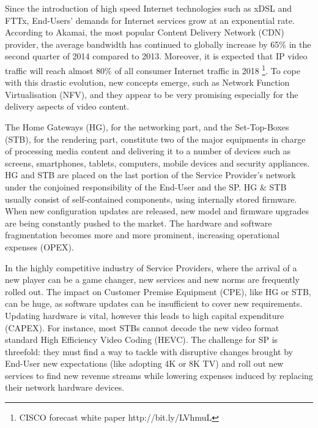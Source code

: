 Since the introduction of high speed Internet technologies such as xDSL and FTTx, End-Users' demands for Internet services grow at an exponential rate.
According to Akamai, the most popular Content Delivery Network (CDN) provider, the average bandwidth has continued to globally increase by 65\% in the second quarter of 2014 \cite{_akamais_2014} compared to 2013. 
Moreover, it is expected that IP video traffic will reach almost 80\% of all consumer Internet traffic in 2018 \footnote{CISCO forecast white paper http://bit.ly/LVhmuL }. To cope with this drastic evolution, new concepts emerge, such as Network Function Virtualisation (NFV), and they appear to be very promising especially for the delivery aspects of video content.

The Home Gateways (HG), for the networking part, and the Set-Top-Boxes (STB), for the rendering part, constitute two of the major equipments in charge of processing media content and delivering it to a number of devices such as screens, smartphones, tablets, computers, mobile devices and security appliances.
HG and STB are placed on the last portion of the Service Provider's network under the conjoined responsibility of the End-User and the SP.
HG \& STB usually consist of self-contained components, using internally stored firmware.
When new configuration updates are released, new model and firmware upgrades are being constantly pushed to the market.
The hardware and software fragmentation becomes more and more prominent, increasing operational expenses (OPEX). 

In the highly competitive industry of Service Providers, where the arrival of a new player can be a game changer, new services and new norms are frequently rolled out.	
The impact on Customer Premise Equipment (CPE), like HG or STB, can be huge, as software updates can be insufficient to cover new requirements.
Updating hardware is vital, however this leads to high capital expenditure (CAPEX).
For instance, most STBs cannot decode the new video format standard  High Efficiency Video Coding (HEVC). 
The challenge for SP is threefold: they must find a way to tackle with disruptive changes brought by End-User new expectations (like adopting 4K or 8K TV) and roll out new services to find new revenue streams while lowering expenses induced by replacing their network hardware devices.


